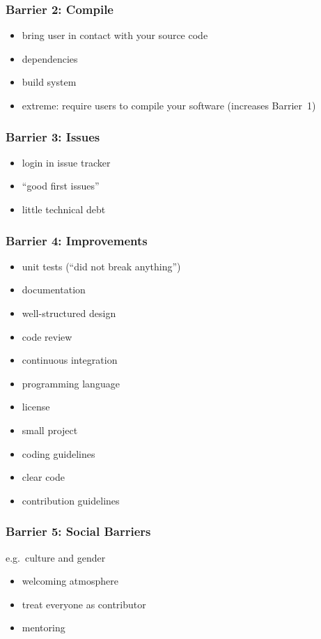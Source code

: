 \begin{frame}
	\frametitle{Barrier 2: Compile}

	\begin{itemize}[<+-| alert@+>]
	\item bring user in contact with your source code
	\item dependencies
	\item build system
	\item extreme: require users to compile your software (increases Barrier~1)
	\end{itemize}
\end{frame}

\begin{frame}
	\frametitle{Barrier 3: Issues}

	\begin{itemize}[<+-| alert@+>]
	\item login in issue tracker
	\item ``good first issues''
	\item little technical debt
	\end{itemize}
\end{frame}

\begin{frame}
	\frametitle{Barrier 4: Improvements~\cite{coelho2018we}}

	\begin{itemize}[<+-| alert@+>]
	\item unit tests (``did not break anything'')
	\item documentation
	\item well-structured design
	\item code review
	\item continuous integration
	\item programming language
	\item license
	\item small project
	\item coding guidelines
	\item clear code
	\item contribution guidelines
	\end{itemize}
\end{frame}

\begin{frame}
	\frametitle{Barrier 5: Social Barriers}

	e.g.\ culture and gender

	\begin{itemize}[<+-| alert@+>]
	\item welcoming atmosphere
	\item treat everyone as contributor
	\item mentoring
	\end{itemize}
\end{frame}

